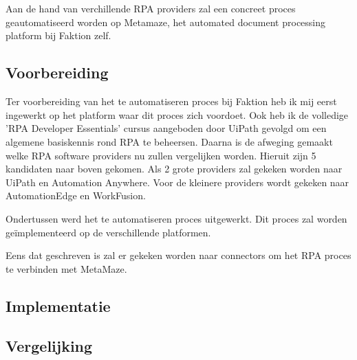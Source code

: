 
\chapter{}
\label{ch:methodologie}


Aan de hand van verchillende RPA providers zal een concreet proces geautomatiseerd worden op Metamaze, het automated document processing platform bij Faktion zelf.


\section{Voorbereiding}
Ter voorbereiding van het te automatiseren proces bij Faktion heb ik mij eerst ingewerkt op het platform waar dit proces zich voordoet. Ook heb ik de volledige 'RPA Developer Essentials' cursus aangeboden door UiPath gevolgd om een algemene basiskennis rond RPA te beheersen. Daarna is de afweging gemaakt welke RPA software providers nu zullen vergelijken worden. Hieruit zijn 5 kandidaten naar boven gekomen. Als 2 grote providers zal gekeken worden naar UiPath en Automation Anywhere. Voor de kleinere providers wordt gekeken naar AutomationEdge en WorkFusion.

Ondertussen werd het te automatiseren proces uitgewerkt. Dit proces zal worden geïmplementeerd op de verschillende  platformen.

Eens dat geschreven is zal er gekeken worden naar connectors om het RPA proces te verbinden met MetaMaze.

\section{Implementatie}
\section{Vergelijking}
